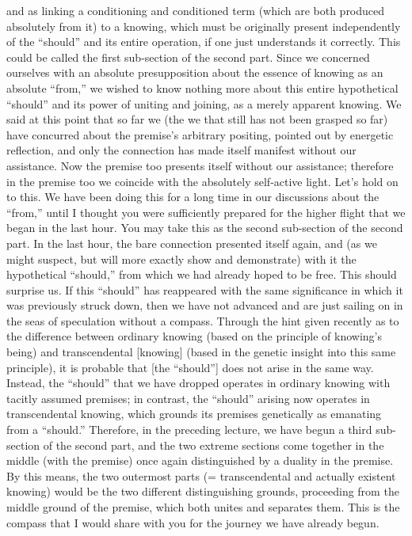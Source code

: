 and as linking a conditioning and conditioned term
(which are both produced absolutely from it)
to a knowing, which must be originally present
independently of the “should”
and its entire operation,
if one just understands it correctly.
This could be called the first
sub-section of the second part.
Since we concerned ourselves with
an absolute presupposition about
the essence of knowing as an absolute “from,”
we wished to know nothing more about
this entire hypothetical “should”
and its power of uniting and joining,
as a merely apparent knowing.
We said at this point that so far we
(the we that still has not been grasped so far)
have concurred about the premise's arbitrary positing,
pointed out by energetic reflection,
and only the connection has made itself manifest
without our assistance.
Now the premise too presents itself without our assistance;
therefore in the premise too we coincide
with the absolutely self-active light.
Let's hold on to this.
We have been doing this for a long time
in our discussions about the “from,”
until I thought you were sufficiently prepared for
the higher flight that we began in the last hour.
You may take this as the second sub-section of the second part.
In the last hour, the bare connection presented itself again,
and (as we might suspect, but will more exactly show and demonstrate)
with it the hypothetical “should,”
from which we had already hoped to be free.
This should surprise us.
If this “should” has reappeared with the same significance
in which it was previously struck down,
then we have not advanced
and are just sailing on
in the seas of speculation without a compass.
Through the hint given recently as to
the difference between ordinary knowing
(based on the principle of knowing's being)
and transcendental [knowing]
(based in the genetic insight into this same principle),
it is probable that [the “should”] does
not arise in the same way.
Instead, the “should” that we have dropped
operates in ordinary knowing
with tacitly assumed premises;
in contrast, the “should” arising now
operates in transcendental knowing,
which grounds its premises genetically
as emanating from a “should.”
Therefore, in the preceding lecture,
we have begun a third sub-section of the second part,
and the two extreme sections come together
in the middle (with the premise) once again
distinguished by a duality in the premise.
By this means, the two outermost parts
(= transcendental and actually existent knowing)
would be the two different distinguishing grounds,
proceeding from the middle ground of the premise,
which both unites and separates them.
This is the compass that I would share with you
for the journey we have already begun.

